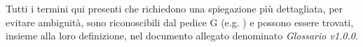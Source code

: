 Tutti i termini qui presenti che richiedono una spiegazione più dettagliata, per evitare ambiguit\`a,
sono riconoscibili dal pedice G (e.g. )
e possono essere trovati, insieme alla loro definizione, nel documento allegato denominato \textit{Glossario v1.0.0}\DAlt.